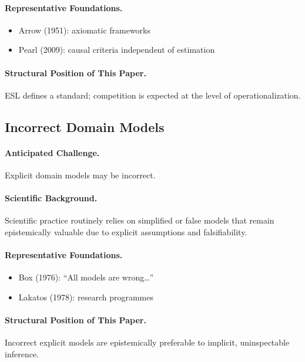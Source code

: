 \paragraph{Representative Foundations.}
\begin{itemize}
    \item Arrow (1951): axiomatic frameworks
    \item Pearl (2009): causal criteria independent of estimation
\end{itemize}

\paragraph{Structural Position of This Paper.}
ESL defines a standard; competition is expected at the level of operationalization.


\subsection{Incorrect Domain Models}

\paragraph{Anticipated Challenge.}
Explicit domain models may be incorrect.

\paragraph{Scientific Background.}
Scientific practice routinely relies on simplified or false models that remain epistemically valuable due to explicit assumptions and falsifiability.

\paragraph{Representative Foundations.}
\begin{itemize}
    \item Box (1976): ``All models are wrong\ldots''
    \item Lakatos (1978): research programmes
\end{itemize}

\paragraph{Structural Position of This Paper.}
Incorrect explicit models are epistemically preferable to implicit, uninspectable inference.


